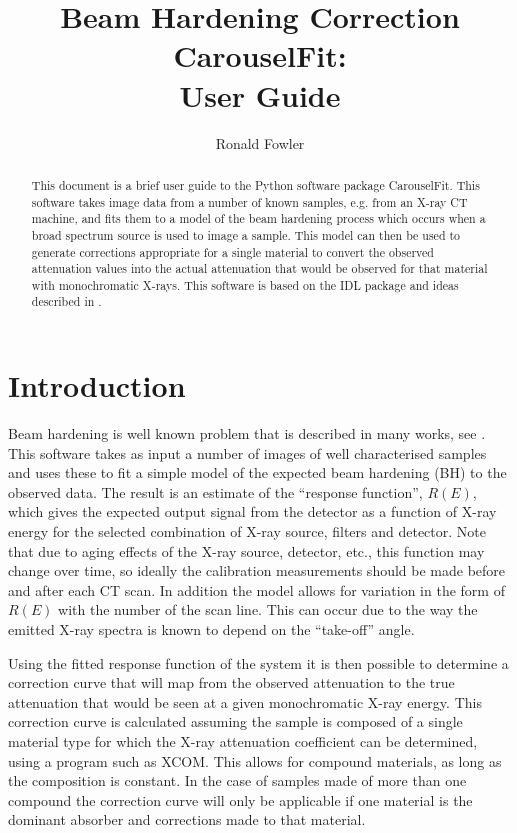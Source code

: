 \documentclass[a4paper,12pt]{article}
\begin{document}
\title{Beam Hardening Correction CarouselFit: \\ User Guide}
\author{Ronald Fowler}

\maketitle

\begin{abstract}
This document is a brief user guide to the Python software package CarouselFit. This software takes image
data from a number of known samples, e.g. from an X-ray CT machine, and fits them to a model of
the beam hardening process which occurs when a broad spectrum source is used to image a sample.
This model can then be used to generate corrections appropriate for a single material to convert
the observed attenuation values into the actual attenuation that would be observed for that material
with monochromatic X-rays.
This software is based on the IDL package and ideas described in \cite{davis}.
\end{abstract}

\section{Introduction}

Beam hardening is well known problem that is described in many works, see \cite{davis}.
This software takes as input a number of images of well characterised samples and uses these
to fit a simple model of the expected beam hardening (BH) to the observed data.
The result is an estimate of the ``response function'', $R(E)$, which gives the expected output signal
from the detector as a function of X-ray energy for the selected combination of X-ray source, filters
and detector.
Note that due to aging effects of the X-ray source, detector, etc., this function may change over time,
so ideally the calibration measurements should be made before and after each CT scan.
In addition the model allows for variation in the form of $R(E)$ with the number of the scan line.
This can occur due to the way the emitted X-ray spectra is known to depend on the ``take-off'' angle\cite{davis}.

Using the fitted response function of the system it is then possible to determine a correction curve
that will map from the observed attenuation to the true attenuation that would be seen at a given
monochromatic X-ray energy.
This correction curve is calculated assuming the sample is composed of a single material type
for which the X-ray attenuation coefficient can be determined, using a program such as XCOM\cite{xcom}.
This allows for compound materials, as long as the composition is constant.
In the case of samples made of more than one compound the correction curve will only be applicable
if one material is the dominant absorber and corrections made to that material.
\end{document}
